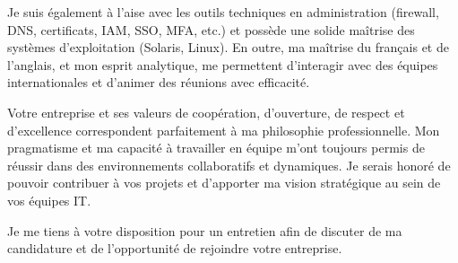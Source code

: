 \documentclass[11pt, a4paper]{awesome-cv}
\begin{document}
\begin{cvletter}
Je suis également à l’aise avec les outils techniques en administration (firewall, DNS, certificats, IAM, SSO, MFA, etc.) et possède une solide maîtrise des systèmes d’exploitation (Solaris, Linux). En outre, ma maîtrise du français et de l’anglais, et mon esprit analytique, me permettent d’interagir avec des équipes internationales et d’animer des réunions avec efficacité.

Votre entreprise et ses valeurs de coopération, d’ouverture, de respect et d’excellence correspondent parfaitement à ma philosophie professionnelle. Mon pragmatisme et ma capacité à travailler en équipe m’ont toujours permis de réussir dans des environnements collaboratifs et dynamiques. Je serais honoré de pouvoir contribuer à vos projets et d’apporter ma vision stratégique au sein de vos équipes IT.

Je me tiens à votre disposition pour un entretien afin de discuter de ma candidature et de l'opportunité de rejoindre votre entreprise.


\end{cvletter}


\makeletterclosing
\end{document}
